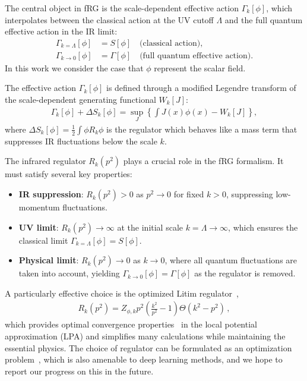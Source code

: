 \documentclass[reprint,twocolumn,superscriptaddress,preprintnumbers,amsmath,amssymb,aps,prd,floatfix]{revtex4-2}
\begin{document}
The central object in fRG is the scale-dependent effective action $\Gamma_k[\phi]$, which interpolates between the classical action at the UV cutoff $\Lambda$ and the full quantum effective action in the IR limit:
\begin{align}
\Gamma_{k=\Lambda}[\phi] &= S[\phi] \quad \text{(classical action)}, \\
\Gamma_{k \to 0}[\phi] &= \Gamma[\phi] \quad \text{(full quantum effective action)}.
\end{align}
In this work we consider the case that $\phi$ represent the scalar field.

The effective action $\Gamma_k[\phi]$ is defined through a modified Legendre transform of the scale-dependent generating functional $W_k[J]$:
\begin{align}
\Gamma_k[\phi] + \Delta S_k[\phi] = \sup_J \left\{ \int J(x) \phi(x) - W_k[J] \right\},
\label{eq:Gamma_k_def}
\end{align}
where $\Delta S_k[\phi] = \frac{1}{2} \int \phi R_k \phi$ is the regulator which behaves like a mass term that suppresses IR fluctuations below the scale $k$.

The infrared regulator $R_k(p^2)$ plays a crucial role in the fRG formalism. It must satisfy several key properties:
\begin{itemize}
\item \textbf{IR suppression}: $R_k(p^2) > 0$ as $p^2 \to 0$ for fixed $k > 0$, suppressing low-momentum fluctuations.
\item \textbf{UV limit}: $R_k(p^2) \to \infty$ at the initial scale $k=\Lambda \to \infty$, which ensures the classical limit $\Gamma_{k=\Lambda}[\phi] = S[\phi]$.
\item \textbf{Physical limit}: $R_k(p^2) \to 0$ as $k \to 0$, where all quantum fluctuations are taken into account, yielding $\Gamma_{k \to 0}[\phi] = \Gamma[\phi]$ as the regulator is removed.
\end{itemize}

A particularly effective choice is the optimized Litim regulator~\cite{Litim:2000ci,Litim:2001up},
\begin{align}
R_k(p^2) = Z_{\phi,k} p^2 \left( \frac{k^2}{p^2} - 1 \right) \Theta(k^2 - p^2)\,, \label{eq:litim_regulator}
\end{align}
which provides optimal convergence properties~\cite{Litim:2001up} in the local potential approximation (LPA) and simplifies many calculations while maintaining the essential physics. The choice of regulator can be formulated as an optimization problem~\cite{Pawlowski:2005xe,Pawlowski:2015mlf}, which is also amenable to deep learning methods, and we hope to report our progress on this in the future.
\end{document}
